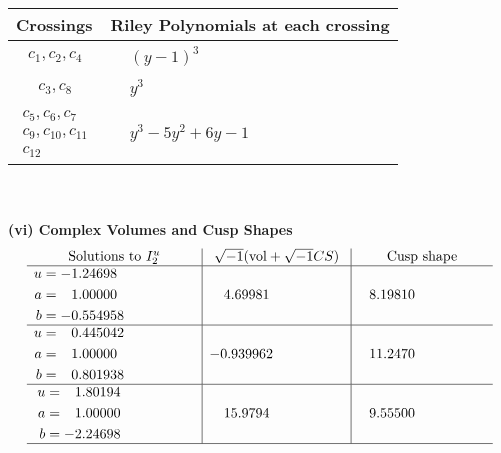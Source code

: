 \documentclass[1p]{elsarticle_modified}
\theoremstyle{definition}
\newcommand{\I}{\sqrt{-1}}
\begin{document}
\begin{tabular}{m{50pt}|m{274pt}}
Crossings & \hspace{64pt}Riley Polynomials at each crossing \\
\hline $$\begin{aligned}c_{1},c_{2},c_{4}\end{aligned}$$&$\begin{aligned}
&(y-1)^3
\end{aligned}$\\
\hline $$\begin{aligned}c_{3},c_{8}\end{aligned}$$&$\begin{aligned}
&y^3
\end{aligned}$\\
\hline $$\begin{aligned}c_{5},c_{6},c_{7}\\c_{9},c_{10},c_{11}\\c_{12}\end{aligned}$$&$\begin{aligned}
&y^3-5 y^2+6 y-1
\end{aligned}$\\
\hline
\end{tabular}\\~\\
\newpage\flushleft \textbf{(vi) Complex Volumes and Cusp Shapes}
$$\begin{array}{c|c|c}  
\text{Solutions to }I^u_{2}& \I (\text{vol} + \sqrt{-1}CS) & \text{Cusp shape}\\
 \hline 
\begin{aligned}
u &= -1.24698\phantom{ +0.000000I} \\
a &= \phantom{-}1.00000\phantom{ +0.000000I} \\
b &= -0.554958\phantom{ +0.000000I}\end{aligned}
 & \phantom{-}4.69981\phantom{ +0.000000I} & \phantom{-}8.19810\phantom{ +0.000000I} \\ \hline\begin{aligned}
u &= \phantom{-}0.445042\phantom{ +0.000000I} \\
a &= \phantom{-}1.00000\phantom{ +0.000000I} \\
b &= \phantom{-}0.801938\phantom{ +0.000000I}\end{aligned}
 & -0.939962\phantom{ +0.000000I} & \phantom{-}11.2470\phantom{ +0.000000I} \\ \hline\begin{aligned}
u &= \phantom{-}1.80194\phantom{ +0.000000I} \\
a &= \phantom{-}1.00000\phantom{ +0.000000I} \\
b &= -2.24698\phantom{ +0.000000I}\end{aligned}
 & \phantom{-}15.9794\phantom{ +0.000000I} & \phantom{-}9.55500\phantom{ +0.000000I}\\
 \hline 
 \end{array}$$\newpage
\end{document}
